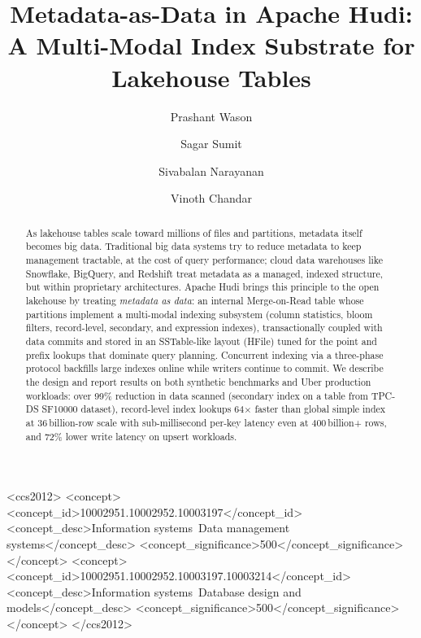 \documentclass[sigconf]{acmart}
\begin{document}
\title{Metadata-as-Data in Apache Hudi: A Multi-Modal Index Substrate for Lakehouse Tables}

\author{Prashant Wason}

\author{Sagar Sumit}

\author{Sivabalan Narayanan}

\author{Vinoth Chandar}

\begin{abstract}
As lakehouse tables scale toward millions of files and partitions, metadata itself becomes big data.
Traditional big data systems try to reduce metadata to keep management tractable, at the cost of query performance; cloud data warehouses like Snowflake, BigQuery, and Redshift treat metadata as a managed, indexed structure, but within proprietary architectures.
Apache Hudi brings this principle to the open lakehouse by treating \emph{metadata as data}: an internal Merge-on-Read table whose partitions implement a multi-modal indexing subsystem (column statistics, bloom filters, record-level, secondary, and expression indexes), transactionally coupled with data commits and stored in an SSTable-like layout (HFile) tuned for the point and prefix lookups that dominate query planning.
Concurrent indexing via a three-phase protocol backfills large indexes online while writers continue to commit.
We describe the design and report results on both synthetic benchmarks and Uber production workloads: over 99\% reduction in data scanned (secondary index on a table from TPC-DS SF10000 dataset), record-level index lookups 64$\times$ faster than global simple index at 36\,billion-row scale with sub-millisecond per-key latency even at 400\,billion+ rows, and 72\% lower write latency on upsert workloads.
\end{abstract}

\begin{CCSXML}
<ccs2012>
 <concept>
  <concept_id>10002951.10002952.10003197</concept_id>
  <concept_desc>Information systems~Data management systems</concept_desc>
  <concept_significance>500</concept_significance>
 </concept>
 <concept>
  <concept_id>10002951.10002952.10003197.10003214</concept_id>
  <concept_desc>Information systems~Database design and models</concept_desc>
  <concept_significance>500</concept_significance>
 </concept>
</ccs2012>
\end{CCSXML}
\end{document}
